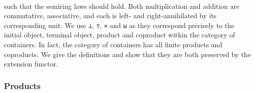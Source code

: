 \begin{code}
\>[0]\AgdaSpace{}%
\AgdaSymbol{:}\AgdaSpace{}%
\AgdaSpace{}%
\AgdaSpace{}%
\AgdaSpace{}%
\AgdaSpace{}%
\<%
\\
\>[0]\AgdaSymbol{(}\AgdaSpace{}%
\AgdaSpace{}%
\AgdaSymbol{)}\AgdaSpace{}%
\AgdaSpace{}%
\AgdaSymbol{(}\AgdaSpace{}%
\AgdaSpace{}%
\AgdaSymbol{)}\AgdaSpace{}%
\AgdaSymbol{=}\AgdaSpace{}%
\AgdaSymbol{(}\AgdaSpace{}%
\AgdaSpace{}%
\AgdaSymbol{)}\AgdaSpace{}%
\AgdaSpace{}%
\AgdaSpace{}%
\AgdaSymbol{(}\AgdaSpace{}%
\AgdaSymbol{)}\AgdaSpace{}%
\AgdaSpace{}%
\AgdaSpace{}%
\AgdaSpace{}%
\AgdaSymbol{;}\AgdaSpace{}%
\AgdaSymbol{(}\AgdaSpace{}%
\AgdaSymbol{)}\AgdaSpace{}%
\AgdaSpace{}%
\AgdaSpace{}%
\AgdaSpace{}%
\AgdaSymbol{\}}\<%
\end{code}

such that the semiring laws should hold. Both multiplication and addition are commutative, associative, and each is left- and right-annihilated by its corresponding unit. We use \texttt{⊥}, \texttt{⊤}, \texttt{×} and \texttt{⊎} as they correspond precisely to the initial object, terminal object, product and coproduct within the category of containers. In fact, the category of containers has all finite products and coproducts. We give the definitions and show that they are both preserved by the extension functor.

\subsubsection*{Products}

